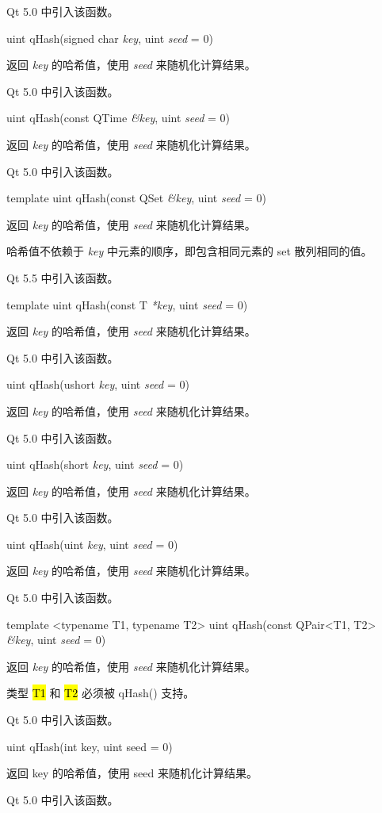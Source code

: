Qt 5.0 中引入该函数。

uint qHash(signed char \emph{key}, uint \emph{seed} = 0)

返回 \emph{key} 的哈希值，使用 \emph{seed} 来随机化计算结果。

Qt 5.0 中引入该函数。

uint qHash(const QTime \emph{\&key}, uint \emph{seed} = 0)

返回 \emph{key} 的哈希值，使用 \emph{seed} 来随机化计算结果。

Qt 5.0 中引入该函数。

template uint qHash(const QSet \emph{\&key}, uint \emph{seed} = 0)

返回 \emph{key} 的哈希值，使用 \emph{seed} 来随机化计算结果。

哈希值不依赖于 \emph{key} 中元素的顺序，即包含相同元素的 set 散列相同的值。

Qt 5.5 中引入该函数。

template uint qHash(const T \emph{*key}, uint \emph{seed} = 0)

返回 \emph{key} 的哈希值，使用 \emph{seed} 来随机化计算结果。

Qt 5.0 中引入该函数。

uint qHash(ushort \emph{key}, uint \emph{seed} = 0)

返回 \emph{key} 的哈希值，使用 \emph{seed} 来随机化计算结果。

Qt 5.0 中引入该函数。

uint qHash(short \emph{key}, uint \emph{seed} = 0)

返回 \emph{key} 的哈希值，使用 \emph{seed} 来随机化计算结果。

Qt 5.0 中引入该函数。

uint qHash(uint \emph{key}, uint \emph{seed} = 0)

返回 \emph{key} 的哈希值，使用 \emph{seed} 来随机化计算结果。

Qt 5.0 中引入该函数。

template <typename T1, typename T2> uint qHash(const QPair<T1, T2> \emph{\&key}, uint \emph{seed} = 0)

返回 \emph{key} 的哈希值，使用 \emph{seed }来随机化计算结果。

类型 \hl{T1} 和 \hl{T2} 必须被 qHash() 支持。

Qt 5.0 中引入该函数。

uint qHash(int key, uint seed = 0)

返回 key 的哈希值，使用 seed 来随机化计算结果。

Qt 5.0 中引入该函数。

